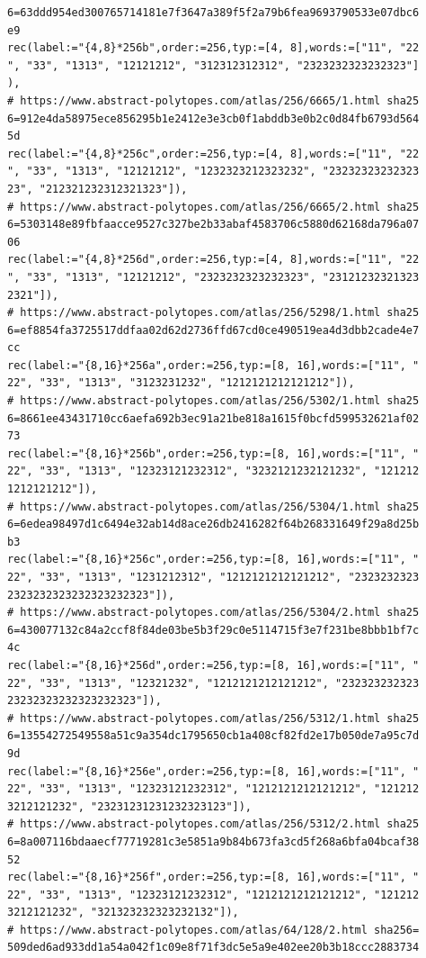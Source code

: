\documentclass[
  11pt,
  a4paper,
]{article}
\begin{document}
\begin{verbatim}
6=63ddd954ed300765714181e7f3647a389f5f2a79b6fea9693790533e07dbc6
e9
rec(label:="{4,8}*256b",order:=256,typ:=[4, 8],words:=["11", "22
", "33", "1313", "12121212", "312312312312", "2323232323232323"]
),
# https://www.abstract-polytopes.com/atlas/256/6665/1.html sha25
6=912e4da58975ece856295b1e2412e3e3cb0f1abddb3e0b2c0d84fb6793d564
5d
rec(label:="{4,8}*256c",order:=256,typ:=[4, 8],words:=["11", "22
", "33", "1313", "12121212", "1232323212323232", "23232323232323
23", "212321232312321323"]),
# https://www.abstract-polytopes.com/atlas/256/6665/2.html sha25
6=5303148e89fbfaacce9527c327be2b33abaf4583706c5880d62168da796a07
06
rec(label:="{4,8}*256d",order:=256,typ:=[4, 8],words:=["11", "22
", "33", "1313", "12121212", "2323232323232323", "23121232321323
2321"]),
# https://www.abstract-polytopes.com/atlas/256/5298/1.html sha25
6=ef8854fa3725517ddfaa02d62d2736ffd67cd0ce490519ea4d3dbb2cade4e7
cc
rec(label:="{8,16}*256a",order:=256,typ:=[8, 16],words:=["11", "
22", "33", "1313", "3123231232", "1212121212121212"]),
# https://www.abstract-polytopes.com/atlas/256/5302/1.html sha25
6=8661ee43431710cc6aefa692b3ec91a21be818a1615f0bcfd599532621af02
73
rec(label:="{8,16}*256b",order:=256,typ:=[8, 16],words:=["11", "
22", "33", "1313", "12323121232312", "3232121232121232", "121212
1212121212"]),
# https://www.abstract-polytopes.com/atlas/256/5304/1.html sha25
6=6edea98497d1c6494e32ab14d8ace26db2416282f64b268331649f29a8d25b
b3
rec(label:="{8,16}*256c",order:=256,typ:=[8, 16],words:=["11", "
22", "33", "1313", "1231212312", "1212121212121212", "2323232323
2323232323232323232323"]),
# https://www.abstract-polytopes.com/atlas/256/5304/2.html sha25
6=430077132c84a2ccf8f84de03be5b3f29c0e5114715f3e7f231be8bbb1bf7c
4c
rec(label:="{8,16}*256d",order:=256,typ:=[8, 16],words:=["11", "
22", "33", "1313", "12321232", "1212121212121212", "232323232323
23232323232323232323"]),
# https://www.abstract-polytopes.com/atlas/256/5312/1.html sha25
6=13554272549558a51c9a354dc1795650cb1a408cf82fd2e17b050de7a95c7d
9d
rec(label:="{8,16}*256e",order:=256,typ:=[8, 16],words:=["11", "
22", "33", "1313", "12323121232312", "1212121212121212", "121212
3212121232", "23231231231232323123"]),
# https://www.abstract-polytopes.com/atlas/256/5312/2.html sha25
6=8a007116bdaaecf77719281c3e5851a9b84b673fa3cd5f268a6bfa04bcaf38
52
rec(label:="{8,16}*256f",order:=256,typ:=[8, 16],words:=["11", "
22", "33", "1313", "12323121232312", "1212121212121212", "121212
3212121232", "321323232323232132"]),
# https://www.abstract-polytopes.com/atlas/64/128/2.html sha256=
509ded6ad933dd1a54a042f1c09e8f71f3dc5e5a9e402ee20b3b18ccc2883734

\end{verbatim}
\end{document}
